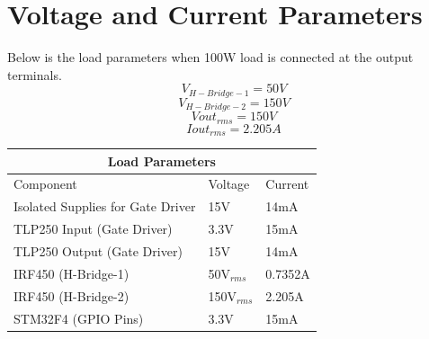 \section{Voltage and Current Parameters}
Below is the load parameters when 100W load is connected at the output terminals.
\begin{equation}
V_{H-Bridge-1} = 50V
\end{equation} 
\begin{equation}
V_{H-Bridge-2} = 150V
\end{equation} 
\begin{equation}
Vout_{rms} = 150V
\end{equation} 
\begin{equation}
Iout_{rms} = 2.205A
\end{equation} 
\begin{center}
	\begin{tabular}{ |p{4cm}||p{4cm}|p{4cm}|  }
		\hline
		\multicolumn{3}{|c|}{Load Parameters} \\
		\hline
		Component & Voltage & Current \\
		\hline
		Isolated Supplies for Gate Driver & 15V & 14mA\\
				\hline
		TLP250 Input (Gate Driver) & 3.3V & 15mA\\
				\hline
		TLP250 Output (Gate Driver) & 15V & 14mA\\
				\hline
		IRF450 (H-Bridge-1) & 50V$_{rms}$ & 0.7352A\\
				\hline
		IRF450 (H-Bridge-2) & 150V$_{rms}$ & 2.205A\\
				\hline
		STM32F4 (GPIO Pins) & 3.3V & 15mA\\
		\hline
	\end{tabular}
\end{center}
